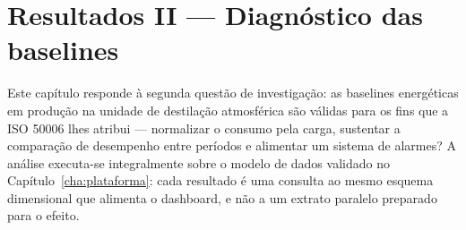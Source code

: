 
\chapter{Resultados II --- Diagnóstico das baselines}
\label{cha:diagnostico}

Este capítulo responde à segunda questão de investigação: as baselines
energéticas em produção na unidade de destilação atmosférica são válidas para
os fins que a ISO 50006 lhes atribui --- normalizar o consumo pela carga,
sustentar a comparação de desempenho entre períodos e alimentar um sistema de
alarmes? A análise executa-se integralmente sobre o modelo de dados
validado no Capítulo~\ref{cha:plataforma}: cada resultado é uma consulta ao
mesmo esquema dimensional que alimenta o dashboard, e não a um extrato
paralelo preparado para o efeito.


